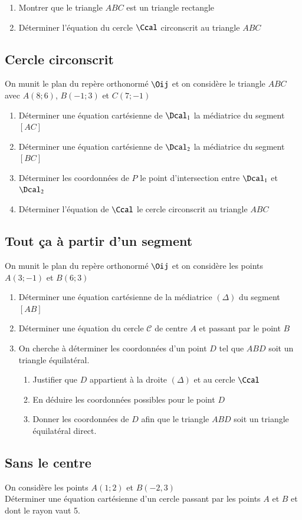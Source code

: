 \documentclass[oneside,12pt]{article}          %
\begin{document}
\begin{enumerate}
    \item Montrer que le triangle $ABC$ est un triangle rectangle
    \item Déterminer l'équation du cercle $\Ccal$ circonscrit au triangle $ABC$
\end{enumerate}



\subsection{Cercle circonscrit}
On munit le plan du repère orthonormé $\Oij$ et on considère le triangle $ABC$ avec $A(8;6)$, $B(-1;3)$ et $C(7;-1)$
\begin{enumerate}
	\item Déterminer une équation cartésienne de $\Dcal_1$ la médiatrice du segment $[AC]$
	\item Déterminer une équation cartésienne de $\Dcal_2$ la médiatrice du segment $[BC]$
	\item Déterminer les coordonnées de $P$ le point d'intersection entre $\Dcal_1$ et $\Dcal_2$
	\item Déterminer l'équation de $\Ccal$ le cercle circonscrit au triangle $ABC$
\end{enumerate}



\subsection{Tout ça à partir d'un segment}
On munit le plan du repère orthonormé $\Oij$ et on considère les points $A(3;-1)$ et $B(6;3)$
\begin{enumerate}
    \item Déterminer une équation cartésienne de la médiatrice $(\Delta)$ du segment $[AB]$
    \item Déterminer une équation du cercle $\mathscr{C}$ de centre $A$ et passant par le point $B$
    \item On cherche à déterminer les coordonnées d'un point $D$ tel que $ABD$ soit un triangle équilatéral.
    \begin{enumerate}
    	\item Justifier que $D$ appartient à la droite $(\Delta)$ et au cercle $\Ccal$
    	\item En déduire les coordonnées possibles pour le point $D$
    	\item Donner les coordonnées de $D$ afin que le triangle $ABD$ soit un triangle équilatéral direct.
    \end{enumerate}
\end{enumerate}



\subsection{Sans le centre}

On considère les points $A(1;2)$ et $B(-2,3)$ \\
Déterminer une équation cartésienne d'un cercle passant par les points $A$ et $B$ et dont le rayon vaut 5.
\end{document}
